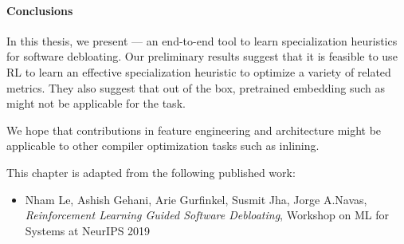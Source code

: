 \paragraph{Conclusions}
In this thesis, we present \doccam --- an end-to-end tool to learn
specialization heuristics for software debloating. Our preliminary results
suggest that it is feasible to use RL to learn an effective specialization
heuristic to optimize a variety of related metrics. They also suggest that out
of the box, pretrained embedding such as \insttovec might not be applicable for the task.

We hope that \doccam contributions in feature engineering and architecture
might be applicable to other compiler optimization tasks such as inlining.

This chapter is adapted from the following published work:
\begin{itemize}
    \item Nham Le, Ashish Gehani, Arie Gurfinkel, Susmit Jha, Jorge A.Navas, \textit{Reinforcement Learning Guided Software Debloating}, Workshop on ML for Systems at NeurIPS 2019
\end{itemize}
